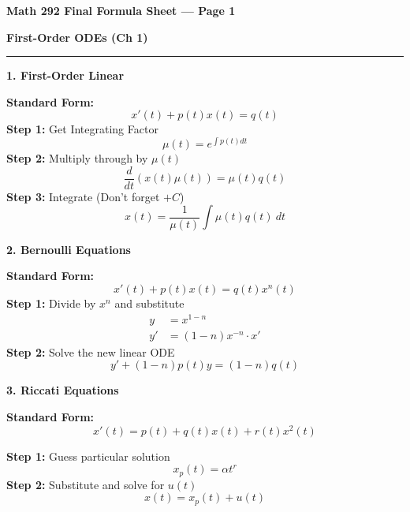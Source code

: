 \documentclass[12pt]{article}
\newcommand{\heading}[1]{%
  \vspace{10pt}
  \textbf{#1} \\[-12pt]
  \rule{\linewidth}{0.4pt}
  \par\vspace{2pt}
}
\newcommand{\sub}[1]{\smallskip\textbf{#1}\;}
\newlength{\colw}
\begin{document}
\begin{center}
    \textbf{\Large Math 292 Final Formula Sheet --- Page 1}
\end{center}

\noindent
\begin{minipage}[t]{\colw}
    \heading{First-Order ODEs (Ch 1)}

    \sub{1. First-Order Linear}

    \textbf{Standard Form:}
    \[ x'(t) + p(t)x(t) = q(t) \]
    \textbf{Step 1:} Get Integrating Factor
    \[ \mu(t) = e^{\int p(t) dt} \]
    \textbf{Step 2:} Multiply through by $\mu(t)$
    \[ \frac{d}{dt}(x(t)\mu(t)) = \mu(t)q(t) \]
    \textbf{Step 3:} Integrate (Don't forget $+C$)
    \[ x(t) = \frac{1}{\mu(t)} \int \mu(t)q(t) ~ dt \]

    \sub{2. Bernoulli Equations}

    \textbf{Standard Form:}
    \[ x'(t) + p(t)x(t) = q(t)x^n(t) \]
    \textbf{Step 1:} Divide by $x^n$ and substitute
    \begin{align*}
        y  & = x^{1-n}              \\
        y' & = (1-n)x^{-n} \cdot x'
    \end{align*}
    \textbf{Step 2:} Solve the new linear ODE
    \[ y' + (1-n)p(t)y = (1-n)q(t) \]

    \sub{3. Riccati Equations}

    \textbf{Standard Form:}
    \[ x'(t) = p(t) + q(t)x(t) + r(t)x^2(t) \]

    \textbf{Step 1:} Guess particular solution
    \[ x_p(t) = \alpha t^r \]
    \textbf{Step 2:} Substitute and solve for $u(t)$
    \[ x(t) = x_p(t) + u(t) \]

\end{minipage}
\hfill\vrule\hfill
\end{document}
